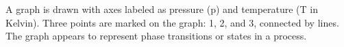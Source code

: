 A graph is drawn with axes labeled as pressure (p) and temperature (T in Kelvin). Three points are marked on the graph: 1, 2, and 3, connected by lines. The graph appears to represent phase transitions or states in a process.